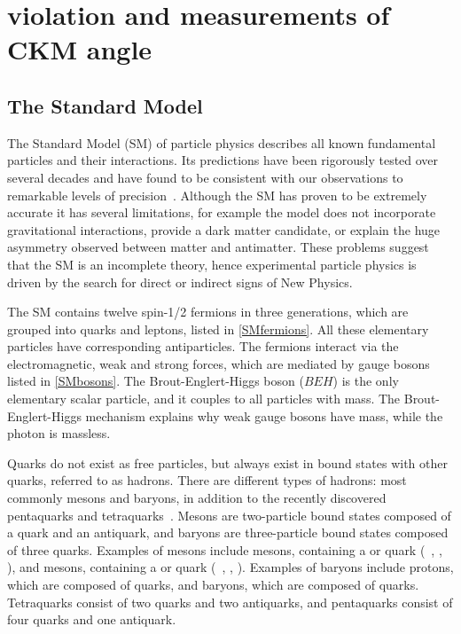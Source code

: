 %

\chapter{\label{ch:2-background}\CP violation and measurements of CKM angle \Pgamma} 


\section{The Standard Model}

The Standard Model (SM) of particle physics describes all known fundamental particles and their interactions. Its predictions have been rigorously tested over several decades and have found to be consistent with our observations to remarkable levels of precision~\cite{SMprecision}. Although the SM has proven to be extremely accurate it has several limitations, for example the model does not incorporate gravitational interactions, provide a dark matter candidate, or explain the huge asymmetry observed between matter and antimatter. These problems suggest that the SM is an incomplete theory, hence experimental particle physics is driven by the search for direct or indirect signs of New Physics.

The SM contains twelve spin-1/2 fermions in three generations, which are grouped into quarks and leptons, listed in \tab\ref{SMfermions}. All these elementary particles have corresponding antiparticles. The fermions interact via the electromagnetic, weak and strong forces, which are mediated by gauge bosons listed in \tab\ref{SMbosons}. The Brout-Englert-Higgs boson ($BEH$) is the only elementary scalar particle, and it couples to all particles with mass. The Brout-Englert-Higgs mechanism explains why weak gauge bosons have mass, while the photon is massless. 

Quarks do not exist as free particles, but always exist in bound states with other quarks, referred to as hadrons. There are different types of hadrons: most commonly mesons and baryons, in addition to the recently discovered pentaquarks and tetraquarks~\cite{pentaquark,tetraquark_BESIII,tetraquark_lhcb}. Mesons are two-particle bound states composed of a quark and an antiquark, and baryons are three-particle bound states composed of three quarks. Examples of mesons include \B mesons, containing a \bquark or \bquarkbar quark (\eg~\Bm, \Bp, \Bz), and \D mesons, containing a \cquark or \cquarkbar quark (\eg~\Dm, \Dp, \Dz). Examples of baryons include protons, which are composed of \uquark\uquark\dquark quarks, and \Lz baryons, which are composed of \uquark\dquark\squark quarks. Tetraquarks consist of two quarks and two antiquarks, and pentaquarks consist of four quarks and one antiquark.

